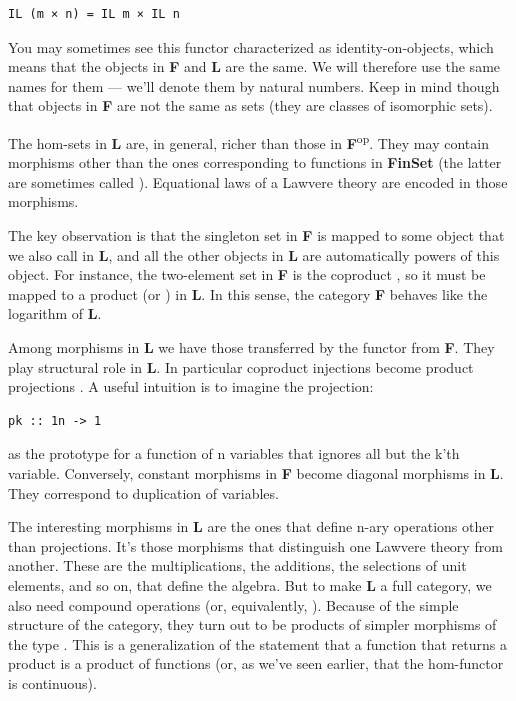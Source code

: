 \begin{Verbatim}[commandchars=\\\{\}]
IL (m × n) = IL m × IL n
\end{Verbatim}

You may sometimes see this functor characterized as identity-on-objects,
which means that the objects in \textbf{F} and \textbf{L} are the same.
We will therefore use the same names for them --- we'll denote them by
natural numbers. Keep in mind though that objects in \textbf{F} are not
the same as sets (they are classes of isomorphic sets).

The hom-sets in \textbf{L} are, in general, richer than those in
\textbf{F}\textsuperscript{op}. They may contain morphisms other than
the ones corresponding to functions in \textbf{FinSet} (the latter are
sometimes called ). Equational laws of a
Lawvere theory are encoded in those morphisms.

The key observation is that the singleton set  in \textbf{F}
is mapped to some object that we also call  in \textbf{L}, and
all the other objects in \textbf{L} are automatically powers of this
object. For instance, the two-element set  in \textbf{F} is
the coproduct , so it must be mapped to a product
 (or ) in \textbf{L}. In this sense, the category
\textbf{F} behaves like the logarithm of \textbf{L}.

Among morphisms in \textbf{L} we have those transferred by the functor
 from \textbf{F}. They play structural role in \textbf{L}. In
particular coproduct injections  become product projections
. A useful intuition is to imagine the projection:

\begin{Verbatim}[commandchars=\\\{\}]
pk :: 1n -> 1
\end{Verbatim}

as the prototype for a function of n variables that ignores all but the
k'th variable. Conversely, constant morphisms 
in \textbf{F} become diagonal morphisms  in
\textbf{L}. They correspond to duplication of variables.

The interesting morphisms in \textbf{L} are the ones that define n-ary
operations other than projections. It's those morphisms that distinguish
one Lawvere theory from another. These are the multiplications, the
additions, the selections of unit elements, and so on, that define the
algebra. But to make \textbf{L} a full category, we also need compound
operations  (or, equivalently,
). Because of the simple structure of
the category, they turn out to be products of simpler morphisms of the
type . This is a generalization of the
statement that a function that returns a product is a product of
functions (or, as we've seen earlier, that the hom-functor is
continuous).

